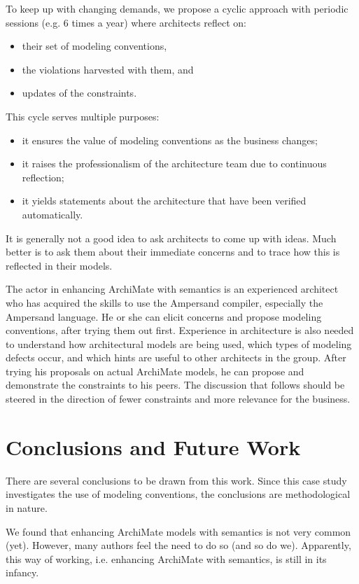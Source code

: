 \documentclass[sn-vancouver]{sn-jnl}%
\begin{document}
To keep up with changing demands, we propose a cyclic approach with periodic sessions (e.g. 6 times a year) where architects reflect on:
\begin{itemize}
   \item their set of modeling conventions,
   \item the violations harvested with them, and
   \item updates of the constraints.
\end{itemize}
This cycle serves multiple purposes:
\begin{itemize}
   \item it ensures the value of modeling conventions as the business changes;
   \item it raises the professionalism of the architecture team due to continuous reflection;
   \item it yields statements about the architecture that have been verified automatically.
\end{itemize}

It is generally not a good idea to ask architects to come up with ideas.
Much better is to ask them about their immediate concerns and to trace how this is reflected in their models.

The actor in enhancing ArchiMate with semantics is an experienced architect who has acquired the skills to use the Ampersand compiler, especially the Ampersand language.
He or she can elicit concerns and propose modeling conventions, after trying them out first.
Experience in architecture is also needed to understand how architectural models are being used,
which types of modeling defects occur,
and which hints are useful to other architects in the group.
After trying his proposals on actual ArchiMate models, he can propose and demonstrate the constraints to his peers.
The discussion that follows should be steered in the direction of fewer constraints and more relevance for the business.

\section{Conclusions and Future Work}\label{conclusion}
There are several conclusions to be drawn from this work.
Since this case study investigates the use of modeling conventions, the conclusions are methodological in nature.

We found that enhancing ArchiMate models with semantics is not very common (yet).
However, many authors feel the need to do so (and so do we).
Apparently, this way of working, i.e. enhancing ArchiMate with semantics, is still in its infancy.
\end{document}

